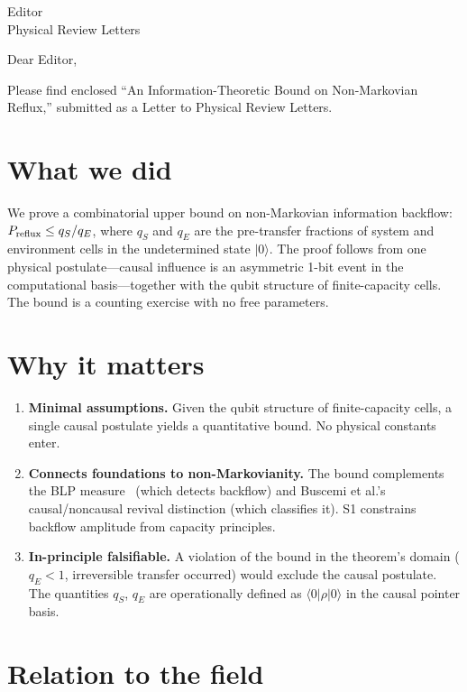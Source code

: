 \documentclass[12pt]{letter}
\begin{document}
\begin{letter}{Editor\\Physical Review Letters}

\opening{Dear Editor,}

Please find enclosed ``An Information-Theoretic Bound on Non-Markovian Reflux,'' submitted as a Letter to Physical Review Letters.

\section*{What we did}

We prove a combinatorial upper bound on non-Markovian information backflow: $P_{\rm reflux} \leq q_S/q_E$, where $q_S$ and $q_E$ are the pre-transfer fractions of system and environment cells in the undetermined state $|0\rangle$. The proof follows from one physical postulate---causal influence is an asymmetric 1-bit event in the computational basis---together with the qubit structure of finite-capacity cells. The bound is a counting exercise with no free parameters.

\section*{Why it matters}

\begin{enumerate}
    \item \textbf{Minimal assumptions.} Given the qubit structure of finite-capacity cells, a single causal postulate yields a quantitative bound. No physical constants enter.
    \item \textbf{Connects foundations to non-Markovianity.} The bound complements the BLP measure~\cite{Breuer:2009} (which detects backflow) and Buscemi et al.'s~\cite{Buscemi:2025} causal/noncausal revival distinction (which classifies it). S1 constrains backflow amplitude from capacity principles.
    \item \textbf{In-principle falsifiable.} A violation of the bound in the theorem's domain ($q_E<1$, irreversible transfer occurred) would exclude the causal postulate. The quantities $q_S$, $q_E$ are operationally defined as $\langle 0|\rho|0\rangle$ in the causal pointer basis.
\end{enumerate}

\section*{Relation to the field}


\end{letter}
\end{document}
